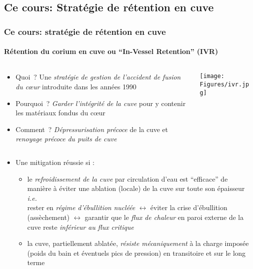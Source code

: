 \subsection{Ce cours: Stratégie de rétention en cuve}
\begin{frame}[fragile]
\frametitle{Ce cours: stratégie de rétention en cuve}
\framesubtitle{Rétention du corium en cuve ou ``In-Vessel Retention'' (IVR)}
\begin{columns}
\begin{column}{0.7\textwidth}
\begin{itemize}
\item Quoi~? Une \emph{stratégie de gestion de l'accident de fusion du c\oe ur} introduite dans les années 1990 \cite{Henry1993,Tuomisto1994}
\item Pourquoi~? \emph{Garder l'intégrité de la cuve} pour y contenir les matériaux fondus du c\oe ur
\item Comment~? \emph{Dépressurisation précoce} de la cuve et \emph{renoyage précoce du puits de cuve} 
\end{itemize}
\end{column}
\begin{column}{0.3\textwidth}
\centering \texttt{[image: Figures/ivr.jpg]}
\end{column}
\end{columns}
\begin{itemize}
\item Une mitigation réussie si :
\begin{itemize}
  \item le \emph{refroidissement de la cuve} par circulation d'eau est ``efficace'' de manière à éviter une ablation (locale) de la cuve sur toute son épaisseur \textit{i.e.} \\
  rester en \emph{régime d'ébullition nucléée} $\leftrightarrow$ éviter la crise d'ébullition (assèchement) $\leftrightarrow$ garantir que le \emph{flux de chaleur} en paroi externe de la cuve reste \emph{inférieur au flux critique}
  \item la cuve, partiellement ablatée, \emph{résiste mécaniquement} à la charge imposée (poids du bain et éventuels pics de pression) en transitoire et sur le long terme
\end{itemize}
\end{itemize}
\end{frame}

